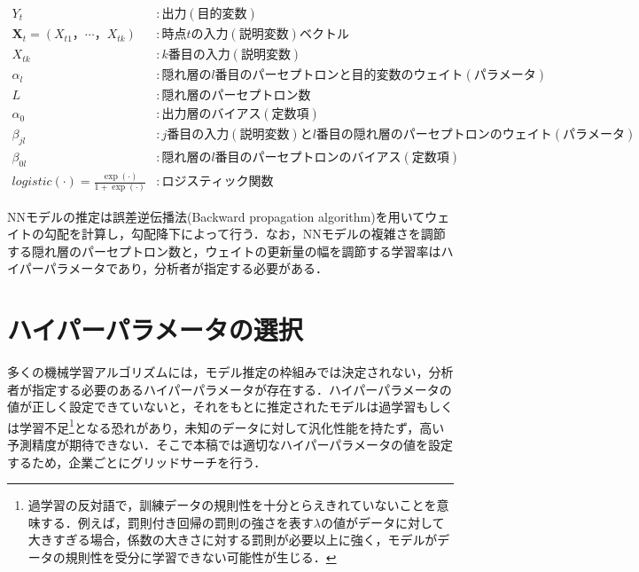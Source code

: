 \documentclass[a4paper，12pt]{jsarticle}
\begin{document}
\begin{equation}
  \begin{split}
    Y_t &: 出力(目的変数) \\
    \bm{X}_t=(X_{t1}，\cdots，X_{tk}) &: 時点tの入力(説明変数)ベクトル \\
    X_{tk} &: k番目の入力(説明変数) \\
    \alpha_l &: 隠れ層のl番目のパーセプトロンと目的変数のウェイト(パラメータ) \\
    L &: 隠れ層のパーセプトロン数 \\
    \alpha_0 &: 出力層のバイアス(定数項) \\
    \beta_{jl} &: j番目の入力(説明変数)とl番目の隠れ層のパーセプトロンのウェイト(パラメータ) \\
    \beta_{0l} &: 隠れ層のl番目のパーセプトロンのバイアス(定数項) \\
    \textit{logistic}(\cdot) = \frac{\exp(\cdot)}{1 + \exp(\cdot)} &: ロジスティック関数
  \end{split}
\end{equation}

NNモデルの推定は誤差逆伝播法(Backward propagation algorithm)を用いてウェイトの勾配を計算し，勾配降下によって行う．なお，NNモデルの複雑さを調節する隠れ層のパーセプトロン数と，ウェイトの更新量の幅を調節する学習率はハイパーパラメータであり，分析者が指定する必要がある．

\section{ハイパーパラメータの選択} \label{sec:hyparam}

多くの機械学習アルゴリズムには，モデル推定の枠組みでは決定されない，分析者が指定する必要のあるハイパーパラメータが存在する．ハイパーパラメータの値が正しく設定できていないと，それをもとに推定されたモデルは過学習もしくは学習不足\footnote{過学習の反対語で，訓練データの規則性を十分とらえきれていないことを意味する．例えば，罰則付き回帰の罰則の強さを表す$\lambda$の値がデータに対して大きすぎる場合，係数の大きさに対する罰則が必要以上に強く，モデルがデータの規則性を受分に学習できない可能性が生じる．}となる恐れがあり，未知のデータに対して汎化性能を持たず，高い予測精度が期待できない．そこで本稿では適切なハイパーパラメータの値を設定するため，企業ごとにグリッドサーチを行う．
\end{document}
